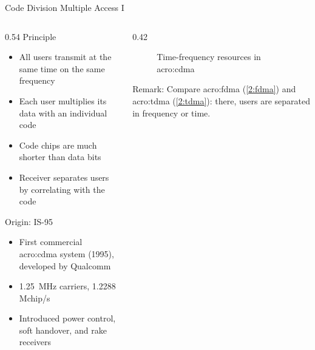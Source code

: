 
\begin{frame}{Code Division Multiple Access I}
  \begin{columns}[T,onlytextwidth]
    \begin{column}{0.54\textwidth}
      Principle
      \begin{itemize}
        \item All users transmit at the same time on the same frequency
        \item Each user multiplies its data with an individual code
        \item Code chips are much shorter than data bits
        \item Receiver separates users by correlating with the code
      \end{itemize}
      \vspace{0.4em}
      Origin: IS-95
      \begin{itemize}
        \item First commercial \gls{acro:cdma} system (1995), developed by Qualcomm~\cite{garg-is95}
        \item \qty{1.25}{\mega\hertz} carriers, \num{1.2288} Mchip/s
        \item Introduced power control, soft handover, and rake receivers
      \end{itemize}
    \end{column}
    \begin{column}{0.42\textwidth}
      \begin{figure}
        \centering
        
        \caption{Time-frequency resources in \gls{acro:cdma}}
      \end{figure}
      \alert{Remark:} Compare \gls{acro:fdma} (\cref{2:fdma}) and \gls{acro:tdma} (\cref{2:tdma}): there, users are separated in frequency or time.
    \end{column}
  \end{columns}
\end{frame}

